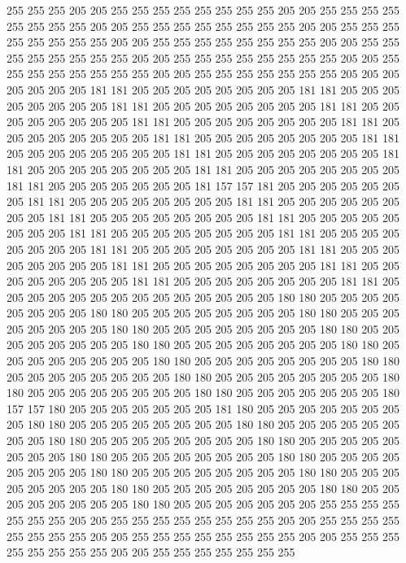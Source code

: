 255 255 255 205 205 255 255 255 255 255 255 255 255 205 205 255 255 255 255 255
255 255 255 205 205 255 255 255 255 255 255 255 255 205 205 255 255 255 255 255
255 255 255 205 205 255 255 255 255 255 255 255 255 205 205 255 255 255 255 255
255 255 255 205 205 255 255 255 255 255 255 255 255 205 205 255 255 255 255 255
255 255 255 205 205 255 255 255 255 255 255 255 205 205 205 205 205 205 205 181
181 205 205 205 205 205 205 205 205 181 181 205 205 205 205 205 205 205 205 181
181 205 205 205 205 205 205 205 205 181 181 205 205 205 205 205 205 205 205 181
181 205 205 205 205 205 205 205 205 181 181 205 205 205 205 205 205 205 205 181
181 205 205 205 205 205 205 205 205 181 181 205 205 205 205 205 205 205 205 181
181 205 205 205 205 205 205 205 205 181 181 205 205 205 205 205 205 205 205 181
181 205 205 205 205 205 205 205 205 181 181 205 205 205 205 205 205 205 181 157
157 181 205 205 205 205 205 205 205 181 181 205 205 205 205 205 205 205 205 181
181 205 205 205 205 205 205 205 205 181 181 205 205 205 205 205 205 205 205 181
181 205 205 205 205 205 205 205 205 181 181 205 205 205 205 205 205 205 205 181
181 205 205 205 205 205 205 205 205 181 181 205 205 205 205 205 205 205 205 181
181 205 205 205 205 205 205 205 205 181 181 205 205 205 205 205 205 205 205 181
181 205 205 205 205 205 205 205 205 181 181 205 205 205 205 205 205 205 205 181
181 205 205 205 205 205 205 205 205 205 205 205 205 205 205 180 180 205 205 205
205 205 205 205 205 180 180 205 205 205 205 205 205 205 205 180 180 205 205 205
205 205 205 205 205 180 180 205 205 205 205 205 205 205 205 180 180 205 205 205
205 205 205 205 205 180 180 205 205 205 205 205 205 205 205 180 180 205 205 205
205 205 205 205 205 180 180 205 205 205 205 205 205 205 205 180 180 205 205 205
205 205 205 205 205 180 180 205 205 205 205 205 205 205 205 180 180 205 205 205
205 205 205 205 205 180 180 205 205 205 205 205 205 205 180 157 157 180 205 205
205 205 205 205 205 181 180 205 205 205 205 205 205 205 205 180 180 205 205 205
205 205 205 205 205 180 180 205 205 205 205 205 205 205 205 180 180 205 205 205
205 205 205 205 205 180 180 205 205 205 205 205 205 205 205 180 180 205 205 205
205 205 205 205 205 180 180 205 205 205 205 205 205 205 205 180 180 205 205 205
205 205 205 205 205 180 180 205 205 205 205 205 205 205 205 180 180 205 205 205
205 205 205 205 205 180 180 205 205 205 205 205 205 205 205 180 180 205 205 205
205 205 205 205 255 255 255 255 255 255 255 205 205 255 255 255 255 255 255 255
255 205 205 255 255 255 255 255 255 255 255 205 205 255 255 255 255 255 255 255
255 205 205 255 255 255 255 255 255 255 255 205 205 255 255 255 255 255 255 255
